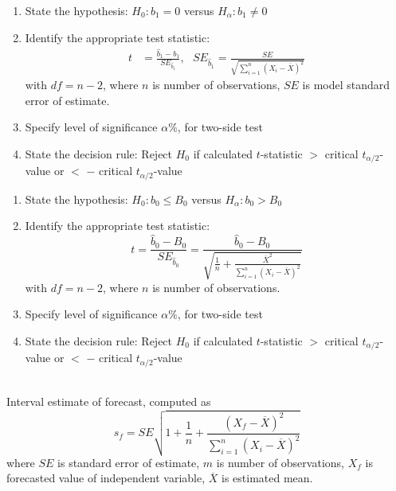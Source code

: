 \begin{definition} 
\begin{enumerate}[label=\arabic*.]
\setlength{\itemsep}{0pt}
\item State the hypothesis: $H_0: b_1 = 0$ versus $H_{\alpha} : b_1 \neq 0$
\item Identify the appropriate test statistic:
\begin{align}
t &= \frac{\hat{b}_1 - b_1}{SE_{\hat{b}_1}}, \ \ \ SE_{\hat{b}_1} = \frac{SE}{\sqrt{{\sum\limits_{i=1}^n (X_i - \overline{X})^2}}} \nonumber
\end{align}
with $df = n-2$, where $n$ is number of observations, $SE$ is model standard error of estimate.
\item Specify level of significance $\alpha \%$, for two-side test
\item State the decision rule: Reject $H_0$ if calculated $t$-statistic $>$ critical $t_{\alpha/2}$-value or $<$ $-$ critical $t_{\alpha/2}$-value
\end{enumerate}
\end{definition}

\begin{definition} 
\begin{enumerate}[label=\arabic*.]
\setlength{\itemsep}{0pt}
\item State the hypothesis: $H_0: b_0 \leq B_0$ versus $H_{\alpha} : b_0 > B_0$
\item Identify the appropriate test statistic:
\begin{equation}
t = \frac{\hat{b}_0 - B_0}{SE_{\hat{b}_0}} = \frac{\hat{b}_0 - B_0}{\sqrt{\frac{1}{n} + \frac{\overline{X}^2}{\sum\limits_{i=1}^n (X_i - \overline{X})^2}}} \nonumber
\end{equation}
with $df = n-2$, where $n$ is number of observations.
\item Specify level of significance $\alpha \%$, for two-side test
\item State the decision rule: Reject $H_0$ if calculated $t$-statistic $>$ critical $t_{\alpha/2}$-value or $<$ $-$ critical $t_{\alpha/2}$-value
\end{enumerate}
\end{definition}

\begin{definition} \\
Interval estimate of forecast, computed as
\begin{equation}
s_f = SE \sqrt{1 + \frac{1}{n} + \frac{(X_f - \overline{X})^2}{\sum\limits_{i=1}^n (X_i - \overline{X})^2}} \nonumber
\end{equation}
where $SE$ is standard error of estimate, $m$ is number of observations, $X_f$ is forecasted value of independent variable, $\overline{X}$ is estimated mean.
\end{definition}

